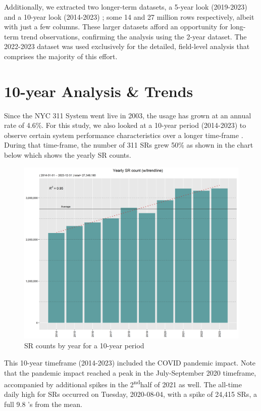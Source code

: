 \documentclass[12pt, titlepage]{article}
\begin{document}
Additionally, we extracted two longer-term datasets, a 5-year look (2019-2023) and a 10-year look (2014-2023) ; some 14  and 27 million rows respectively, albeit with just a few columns. 
These larger datasets afford an opportunity for long-term trend observations, confirming the analysis using the 2-year dataset. The 2022-2023 dataset
was used exclusively for the detailed, field-level analysis that comprises the majority of this effort. 

\section{10-year Analysis \& Trends} \label{sec:history}

Since the NYC 311 System went live in 2003, the usage has grown at an annual
rate of 4.6\%. For this study, we also looked at a 10-year period (2014-2023) to
observe certain system performance characteristics over a longer time-frame . 
During that time-frame, the number of 311 SRs grew 50\% as shown in the chart below which shows the yearly SR counts.

\begin{figure}[htbp]
  \centering
  \includegraphics[width=\textwidth]{Yearly.png}
  \caption{SR counts by year for a 10-year period}
  \label{fig:yearly-counts}
\end{figure}

This 10-year timeframe (2014-2023) included the COVID pandemic impact. Note that the pandemic
impact reached a peak in the July-September 2020 timeframe, accompanied by additional spikes
in the 2\textsuperscript{nd}half of 2021 as well. The all-time daily high for SRs occurred on Tuesday, 2020-08-04, with a spike of
24,415 SRs, a full 9.8 \textsigma's from the mean. 
\end{document}
